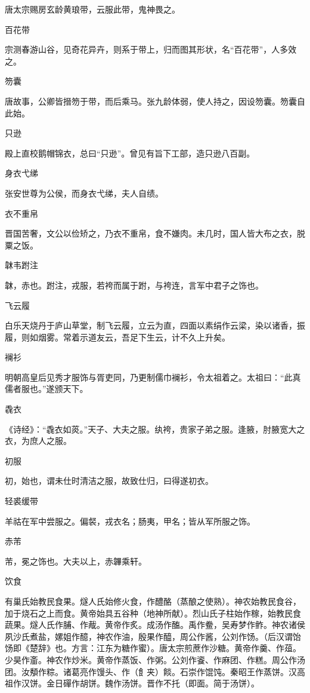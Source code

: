 \documentclass[a4paper,12pt,UTF8,twoside]{ctexbook}
\begin{document}
    唐太宗赐房玄龄黄琅带，云服此带，鬼神畏之。
    
    百花带
    
    宗测春游山谷，见奇花异卉，则系于带上，归而图其形状，名“百花带”，人多效之。
    
    笏囊
    
    唐故事，公卿皆搢笏于带，而后乘马。张九龄体弱，使人持之，因设笏囊。笏囊自此始。
    
    只逊
    
    殿上直校鹅帽锦衣，总曰“只逊”。曾见有旨下工部，造只逊八百副。
    
    身衣弋绨
    
    张安世尊为公侯，而身衣弋绨，夫人自绩。
    
    衣不重帛
    
    晋国苦奢，文公以俭矫之，乃衣不重帛，食不嫌肉。未几时，国人皆大布之衣，脱粟之饭。
    
    韎韦跗注
    
    韎，赤也。跗注，戎服，若袴而属于跗，与袴连，言军中君子之饰也。
    
    飞云履
    
    白乐天烧丹于庐山草堂，制飞云履，立云为直，四面以素绢作云梁，染以诸香，振履，则如烟雾。常着示道友云，吾足下生云，计不久上升矣。
    
    襕衫
    
    明朝高皇后见秀才服饰与胥吏同，乃更制儒巾襕衫，令太祖着之。太祖曰：“此真儒者服也。”遂颁天下。
    
    毳衣
    
    《诗经》：“毳衣如菼。”天子、大夫之服。纨袴，贵家子弟之服。逢腋，肘腋宽大之衣，为庶人之服。
    
    初服
    
    初，始也，谓未仕时清洁之服，故致仕归，曰得遂初衣。
    
    轻裘缓带
    
    羊祜在军中尝服之。偏裻，戎衣名；肠夷，甲名；皆从军所服之饰。
    
    赤芾
    
    芾，冕之饰也。大夫以上，赤韠乘轩。
    
    饮食
    
    有巢氏始教民食果。燧人氏始修火食，作醴酪（蒸酿之使熟）。神农始教民食谷，加于烧石之上而食。黄帝始具五谷种（地神所献）。烈山氏子柱始作稼，始教民食蔬果。燧人氏作脯、作胾。黄帝作炙。成汤作醢。禹作鲞，吴寿梦作鲊。神农诸侯夙沙氏煮盐，嫘姐作醷，神农作油，殷果作醯，周公作酱，公刘作饧。（后汉谓饴饧即《楚辞》也。方言：江东为糖作蜜）。唐太宗煎蔗作沙糖。黄帝作羹、作葅。少昊作齑。神农作炒米。黄帝作蒸饭、作粥。公刘作餈、作麻团、作糕。周公作汤团。汝頺作粽。诸葛亮作馒头、作（飠夹）餤。石崇作馄饨。秦昭王作蒸饼。汉高祖作汉饼。金日磾作胡饼。魏作汤饼。晋作不托（即面。简于汤饼）。
    
\end{document}
